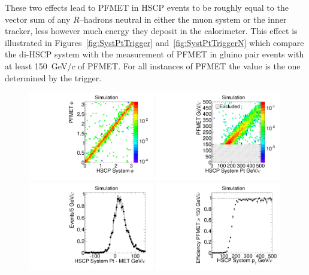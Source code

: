 These two effects lead to PFMET in HSCP events to be roughly equal to the vector sum of any $R$--hadrons neutral in
either the muon system or the inner tracker, less however much energy they deposit in the calorimeter. This effect is illustrated in Figures~\ref{fig:SystPtTrigger} 
and~\ref{fig:SystPtTriggerN} which compare the di-HSCP system with the measurement of PFMET
in gluino pair events with at least 150~GeV/$c$ of PFMET. For all instances of PFMET the value is the one determined by the trigger.

\begin{figure}
  \begin{center}
      \includegraphics[clip=false, trim=0.0cm 0cm 0.0cm 0cm, width=0.49\textwidth]{figures/search/Gluino_8TeV_M1200_f100SystPhiMET}
      \includegraphics[clip=false, trim=0.0cm 0cm 0.0cm 0cm, width=0.49\textwidth]{figures/search/Gluino_8TeV_M1200_f100SystPtMET} \\
      \includegraphics[clip=false, trim=0.0cm 0cm 0.0cm 0cm, width=0.49\textwidth]{figures/search/Gluino_8TeV_M1200_f100SystPtDiffMET}
      \includegraphics[clip=false, trim=0.0cm 0cm 0.0cm 0cm, width=0.49\textwidth]{figures/search/Gluino_8TeV_M1200_f100SystPtEff}

\end{center}
\end{figure}
